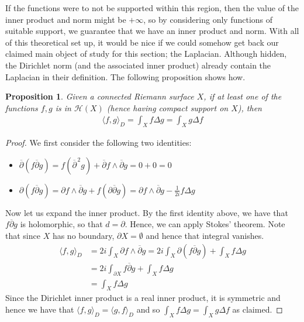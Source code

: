 \documentclass[11pt]{report}
\newtheorem{prop}[thm]{Proposition}
\theoremstyle{definition}
\begin{document}
If the functions were to not be supported within this region, then the value of the inner product and norm might be $+\infty$, so by considering only functions of suitable support, we guarantee that we have an inner product and norm. With all of this theoretical set up, it would be nice if we could somehow get back our claimed main object of study for this section; the Laplacian. Although hidden, the Dirichlet norm (and the associated inner product) already contain the Laplacian in their definition. The following proposition shows how.

\begin{prop}\label{InnerLaplacian}
  Given a connected Riemann surface $X$, if at least one of the functions $f,g$ is in $\mathcal{H}(X)$ (hence having compact support on $X$), then 
  \begin{align*}
    \langle f, g \rangle_D = \int_X f \Delta g = \int_X g \Delta f
  \end{align*}
\end{prop}
\begin{proof}
  We first consider the following two identities:
  \begin{itemize}
    \item $\overline{\partial}(f\overline{\partial}g) = f (\overline{\partial}^{\, 2} g) + \overline{\partial}f \wedge \overline{\partial}g = 0 + 0 = 0$
    \item $\partial(f\overline{\partial}g)=\partial f \wedge \overline{\partial}g + f(\partial\overline{\partial}g)=\partial f \wedge \overline{\partial}g - \frac{1}{2i}f\Delta g$
  \end{itemize}
  Now let us expand the inner product. By the first identity above, we have that $f\overline{\partial}g$ is holomorphic, so that $d = \partial$. Hence, we can apply Stokes' theorem. Note that since $X$ has no boundary, $\partial X = \emptyset$ and hence that integral vanishes.
  \begin{align*}
    \langle f, g \rangle_D &= 2i\int_X \partial f \wedge \overline{\partial}g = 2i\int_X \partial(f\overline{\partial}g)+\int_X f\Delta g \\
    &= 2i\int_{\partial X} f\overline{\partial}g + \int_X f\Delta g \\
    &= \int_X f\Delta g
  \end{align*}
  Since the Dirichlet inner product is a real inner product, it is symmetric and hence we have that $\langle f, g \rangle_D = \langle g, f \rangle_D $ and so $\int_X f\Delta g = \int_X g \Delta f$ as claimed.
\end{proof}
\end{document}
